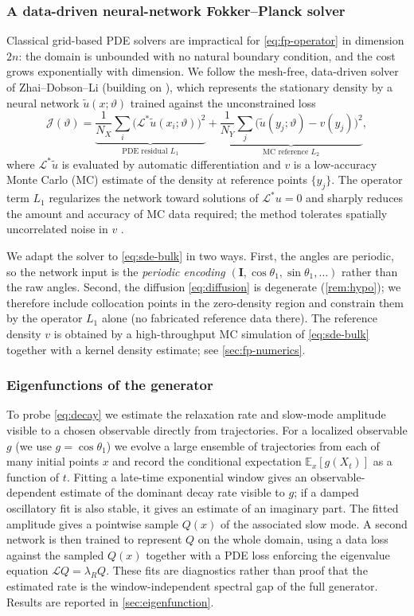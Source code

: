 \documentclass[11pt,a4paper]{article}
\theoremstyle{definition}
\newcommand{\E}{\mathbb{E}}
\numberwithin{equation}{section}   %
\newcommand{\bI}{\mathbf{I}}
\newcommand{\Lgen}{\mathcal{L}}
\newcommand{\Ladj}{\mathcal{L}^{*}}
\begin{document}
\subsubsection{A data-driven neural-network Fokker--Planck solver}
Classical grid-based PDE solvers are impractical for \eqref{eq:fp-operator} in
dimension $2n$: the domain is unbounded with no natural boundary condition, and
the cost grows exponentially with dimension. We follow the mesh-free,
data-driven solver of Zhai--Dobson--Li \cite{ZhaiDobsonLi} (building on
\cite{Li2019,DobsonLiZhai}), which represents the stationary density by a neural
network $\tilde u(x;\vartheta)$ trained against the unconstrained loss
\begin{equation}\label{eq:nn-loss}
  \mathcal{J}(\vartheta)
  = \underbrace{\frac{1}{N_X}\sum_{i}\big(\Ladj \tilde u(x_i;\vartheta)\big)^2}_{\text{PDE residual } L_1}
  + \underbrace{\frac{1}{N_Y}\sum_{j}\big(\tilde u(y_j;\vartheta)-v(y_j)\big)^2}_{\text{MC reference } L_2},
\end{equation}
where $\Ladj\tilde u$ is evaluated by automatic differentiation and $v$ is a
low-accuracy Monte Carlo (MC) estimate of the density at reference points
$\{y_j\}$. The operator term $L_1$ regularizes the network toward solutions of
$\Ladj u=0$ and sharply reduces the amount and accuracy of MC data required;
the method tolerates spatially uncorrelated noise in $v$ \cite{ZhaiDobsonLi}.

We adapt the solver to \eqref{eq:sde-bulk} in two ways. First, the angles are
periodic, so the network input is the \emph{periodic encoding}
$(\bI,\cos\theta_1,\sin\theta_1,\dots)$ rather than the raw angles. Second, the
diffusion \eqref{eq:diffusion} is degenerate (\cref{rem:hypo}); we therefore
include collocation points in the zero-density region and constrain them by the
operator $L_1$ alone (no fabricated reference data there). The reference density
$v$ is obtained by a high-throughput MC simulation of \eqref{eq:sde-bulk}
together with a kernel density estimate; see \cref{sec:fp-numerics}.

\subsubsection{Eigenfunctions of the generator}
To probe \eqref{eq:decay} we estimate the relaxation rate and slow-mode
amplitude visible to a chosen observable directly from trajectories. For a
localized observable $g$ (we use
$g=\cos\theta_1$) we evolve a large ensemble of trajectories from each of many
initial points $x$ and record the conditional expectation $\E_x[g(X_t)]$ as a
function of $t$. Fitting a late-time exponential window gives an
observable-dependent estimate of the dominant decay rate visible to $g$; if a
damped oscillatory fit is also stable, it gives an estimate of an imaginary
part. The fitted amplitude gives a pointwise sample $Q(x)$ of the associated
slow mode.
A second network is then trained to represent $Q$ on the whole domain, using a
data loss against the sampled $Q(x)$ together with a PDE loss enforcing the
eigenvalue equation $\Lgen Q=\lambda_R Q$. These fits are diagnostics rather
than proof that the estimated rate is the window-independent spectral gap of
the full generator. Results are reported in
\cref{sec:eigenfunction}.
\end{document}
